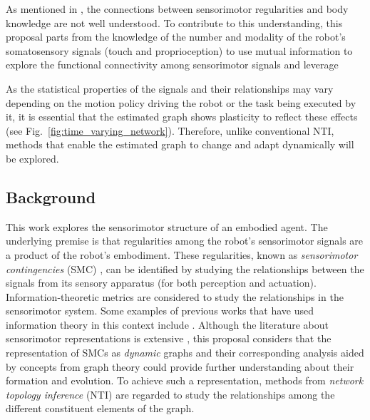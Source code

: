 As mentioned in \cite{Jacquey2019Sensorimotorcontingenciesas}, the connections between sensorimotor regularities and body knowledge are not well understood. To contribute to this understanding, this proposal parts from the knowledge of the number and modality of the robot's somatosensory signals (touch and proprioception) to use mutual information to explore the functional connectivity among sensorimotor signals and leverage 

As the statistical properties of the signals and their relationships may vary depending on the motion policy driving the robot or the task being executed by it, it is essential that the estimated graph shows plasticity to reflect these effects (see Fig.~\ref{fig:time_varying_network}). Therefore, unlike conventional NTI, methods that enable the estimated graph to change and adapt dynamically will be explored.

\subsection{Background}
This work explores the sensorimotor structure of an embodied agent. The underlying premise is that regularities among the robot's sensorimotor signals are a product of the robot’s embodiment. These regularities, known as \emph{sensorimotor contingencies} (SMC) \cite{Jacquey2019Sensorimotorcontingenciesas}, can be identified by studying the relationships between the signals from its sensory apparatus (for both perception and actuation). Information-theoretic metrics are considered to study the relationships in the sensorimotor system. Some examples of previous works that have used information theory in this context include  \cite{Schmidt2013Bootstrappingperceptionusing,Lungarella2006Mappinginformationflow,Polani2009Modelsinformationprocessing,Bossomaier2016introductiontransferentropy,Olsson2006unknownsensorsactuators}. Although the literature about sensorimotor representations is extensive \cite{Nguyen2021Sensorimotorrepresentationlearning}, this proposal considers that the representation of SMCs as \emph{dynamic} graphs and their corresponding analysis aided by concepts from graph theory could provide further understanding about their formation and evolution. To achieve such a representation, methods from \emph{network topology inference} (NTI)\cite{Dong2019Learninggraphsdata} are regarded to study the relationships among the different constituent elements of the graph.

